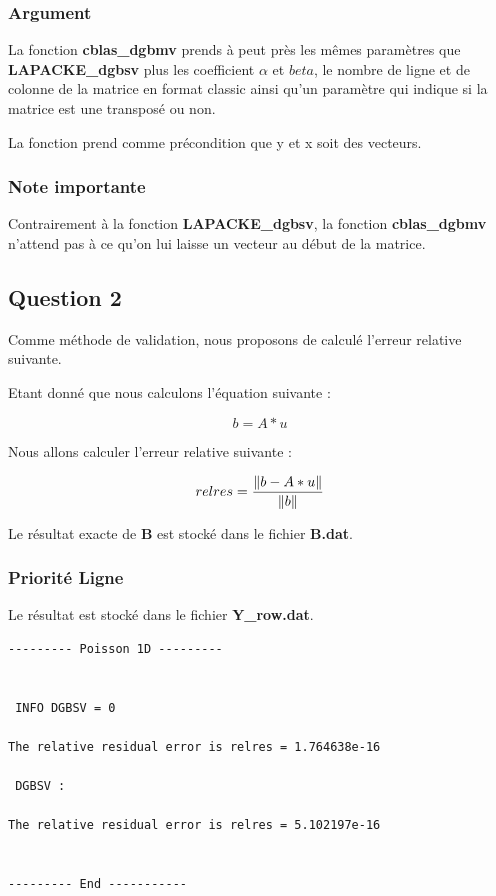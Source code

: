 \documentclass[11pt]{article}
\DeclarePairedDelimiter{\norm}{\lVert}{\rVert}
\begin{document}
\subsubsection{Argument}

La fonction \textbf{cblas\_dgbmv} prends à peut près les mêmes
paramètres que \textbf{LAPACKE\_dgbsv} plus les coefficient $\alpha$
et $beta$, le nombre de ligne et de colonne de la matrice en format
classic ainsi qu'un paramètre qui indique si la matrice est une
transposé ou non.\newline

La fonction prend comme précondition que y et x soit des vecteurs.

\subsubsection{Note importante}

Contrairement à la fonction \textbf{LAPACKE\_dgbsv}, la fonction
\textbf{cblas\_dgbmv} n'attend pas à ce qu'on lui laisse un vecteur au
début de la matrice.

\subsection{Question 2}

Comme méthode de validation, nous proposons de calculé l'erreur
relative suivante.\newline

Etant donné que nous calculons l'équation suivante :

\begin{equation*}
b = A * u
\end{equation*}

Nous allons calculer l'erreur relative suivante :

\begin{equation*}
relres = \frac{\norm{b - A * u}}{\norm{b}}
\end{equation*}

Le résultat exacte de \textbf{B} est stocké dans le fichier \textbf{B.dat}.

\subsubsection{Priorité Ligne}

Le résultat est stocké dans le fichier \textbf{Y\_row.dat}.\newline

\begin{lstlisting}
--------- Poisson 1D ---------


 INFO DGBSV = 0

The relative residual error is relres = 1.764638e-16

 DGBSV :

The relative residual error is relres = 5.102197e-16


--------- End -----------
\end{lstlisting}
\end{document}
